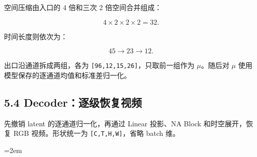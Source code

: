 \documentclass[
  11pt,
  a4paper,
  fontset=none]{ctexart}
\newcommand{\NotesTableStyle}{\linespread{1}\fontsize{9.5pt}{13pt}\selectfont\setlength{\tabcolsep}{4pt}\renewcommand{\arraystretch}{1.1}\setlength{\extrarowheight}{5pt}\setlength{\LTpre}{5pt}\setlength{\LTpost}{6pt}\setlength{\parskip}{0pt}\emergencystretch=2em}
\begin{document}
\endgroup

空间压缩由入口的 4 倍和三次 2 倍空间合并组成：

\[
4\times2\times2\times2=32.
\]

时间长度则依次为：

\[
45\rightarrow23\rightarrow12.
\]

出口沿通道拆成两组，各为 \texttt{{[}96,12,15,26{]}}，只取前一组作为
\textbf{\(\mu\)}。随后对 \(\mu\)
使用模型保存的逐通道均值和标准差归一化。


\subsection{5.4 Decoder：逐级恢复视频}\label{flux3-decoder}

先撤销 latent 的逐通道归一化，再通过 Linear 投影、NA Block
和时空展开，恢复 RGB 视频。形状统一为 \texttt{{[}C,T,H,W{]}}，省略 batch
维。

\begingroup\NotesTableStyle\fontsize{10.5pt}{14pt}\selectfont\renewcommand{\arraystretch}{1.08}\setlength{\extrarowheight}{3pt}
\end{document}
